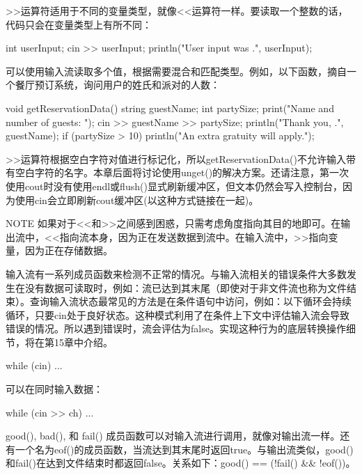>{}>运算符适用于不同的变量类型，就像<{}<运算符一样。要读取一个整数的话，代码只会在变量类型上有所不同：

\begin{cpp}
int userInput;
cin >> userInput;
println("User input was {}.", userInput);
\end{cpp}

可以使用输入流读取多个值，根据需要混合和匹配类型。例如，以下函数，摘自一个餐厅预订系统，询问用户的姓氏和派对的人数：

\begin{cpp}
void getReservationData()
{
    string guestName;
    int partySize;
    print("Name and number of guests: ");
    cin >> guestName >> partySize;
    println("Thank you, {}.", guestName);
    if (partySize > 10) {
        println("An extra gratuity will apply.");
    }
}
\end{cpp}

>{}>运算符根据空白字符对值进行标记化，所以getReservationData()不允许输入带有空白字符的名字。本章后面将讨论使用unget()的解决方案。还请注意，第一次使用cout时没有使用endl或flush()显式刷新缓冲区，但文本仍然会写入控制台，因为使用cin会立即刷新cout缓冲区(以这种方式链接在一起)。

\begin{myNotic}{NOTE}
如果对于<{}<和>{}>之间感到困惑，只需考虑角度指向其目的地即可。在输出流中，<{}<指向流本身，因为正在发送数据到流中。在输入流中，>{}>指向变量，因为正在存储数据。
\end{myNotic}


输入流有一系列成员函数来检测不正常的情况。与输入流相关的错误条件大多数发生在没有数据可读取时，例如：流已达到其末尾（即使对于非文件流也称为文件结束）。查询输入流状态最常见的方法是在条件语句中访问，例如：以下循环会持续循环，只要cin处于良好状态。这种模式利用了在条件上下文中评估输入流会导致错误的情况。所以遇到错误时，流会评估为false。实现这种行为的底层转换操作细节，将在第15章中介绍。

\begin{cpp}
while (cin) { ... }
\end{cpp}

可以在同时输入数据：

\begin{cpp}
while (cin >> ch) { ... }
\end{cpp}

good(), bad(), 和 fail() 成员函数可以对输入流进行调用，就像对输出流一样。还有一个名为eof()的成员函数，当流达到其末尾时返回true。与输出流类似，good()和fail()在达到文件结束时都返回false。关系如下：good() == (!fail() \&\& !eof())。

